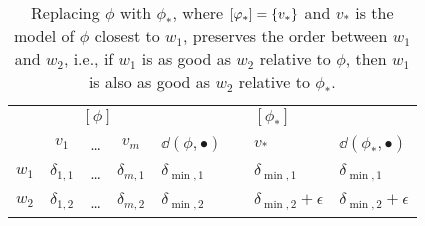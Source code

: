 \begin{table}\centering
	\begin{tabular}{m{2.5em} ccc >{\centering}m{4em} c >{\raggedright}m{4em} m{4em}}
		\toprule
		&\multicolumn{3}{c}{$[\phi]$} &&\qquad\qquad& $[\phi_\ast]$ &  \\
		& $v_1$ & \dots & $v_m$ & $\dd(\phi,\bullet)$ && $v_\ast$ & $\dd(\phi_\ast,\bullet)$\\\midrule
		$w_1$ & $\delta_{1,1}$ & \dots & $\delta_{m,1}$ & $\delta_{\min,1}$ & & $\delta_{\min,1}$ & $\delta_{\min,1}$\\
		$w_2$ & $\delta_{1,2}$ & \dots & $\delta_{m,2}$ & $\delta_{\min,2}$ & & $\delta_{\min,2}+\epsilon$ & $\delta_{\min,2}+\epsilon$\\\bottomrule
	\end{tabular}
	\caption{
		Replacing $\phi$ with $\phi_\ast$, 
		where $[\varphi_\ast]=\{{v_\ast}\}$ and $v_\ast$ is the model of $\phi$ closest to $w_1$,
		preserves the order between $w_1$ and $w_2$,
		i.e., if $w_1$ is as good as $w_2$ relative to $\phi$,
		then $w_1$ is also as good as $w_2$ relative to $\phi_{\ast}$.
	}
	\label{tab:5-replacing-base-with-complete-base}
\end{table}

